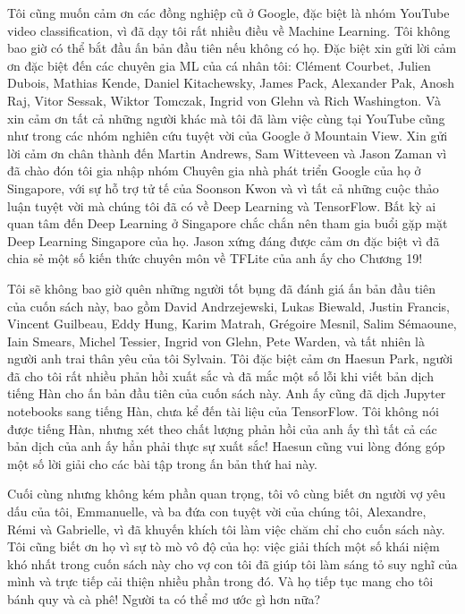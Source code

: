 Tôi cũng muốn cảm ơn các đồng nghiệp cũ ở Google, đặc biệt là nhóm YouTube video classification, vì đã dạy tôi rất nhiều điều về Machine Learning. Tôi không bao giờ có thể bắt đầu ấn bản đầu tiên nếu không có họ. Đặc biệt xin gửi lời cảm ơn đặc biệt đến các chuyên gia ML của cá nhân tôi: Clément Courbet, Julien Dubois, Mathias Kende, Daniel Kitachewsky, James Pack, Alexander Pak, Anosh Raj, Vitor Sessak, Wiktor Tomczak, Ingrid von Glehn và Rich Washington. Và xin cảm ơn tất cả những người khác mà tôi đã làm việc cùng tại YouTube cũng như trong các nhóm nghiên cứu tuyệt vời của Google ở ​​Mountain View. Xin gửi lời cảm ơn chân thành đến Martin Andrews, Sam Witteveen và Jason Zaman vì đã chào đón tôi gia nhập nhóm Chuyên gia nhà phát triển Google của họ ở Singapore, với sự hỗ trợ tử tế của Soonson Kwon và vì tất cả những cuộc thảo luận tuyệt vời mà chúng tôi đã có về Deep Learning và TensorFlow. Bất kỳ ai quan tâm đến Deep Learning ở Singapore chắc chắn nên tham gia buổi gặp mặt Deep Learning Singapore của họ. Jason xứng đáng được cảm ơn đặc biệt vì đã chia sẻ một số kiến ​​thức chuyên môn về TFLite của anh ấy cho Chương 19!

Tôi sẽ không bao giờ quên những người tốt bụng đã đánh giá ấn bản đầu tiên của cuốn sách này, bao gồm David Andrzejewski, Lukas Biewald, Justin Francis, Vincent Guilbeau, Eddy Hung, Karim Matrah, Grégoire Mesnil, Salim Sémaoune, Iain Smears, Michel Tessier, Ingrid von Glehn, Pete Warden, và tất nhiên là người anh trai thân yêu của tôi Sylvain. Tôi đặc biệt cảm ơn Haesun Park, người đã cho tôi rất nhiều phản hồi xuất sắc và đã mắc một số lỗi khi viết bản dịch tiếng Hàn cho ấn bản đầu tiên của cuốn sách này. Anh ấy cũng đã dịch Jupyter notebooks sang tiếng Hàn, chưa kể đến tài liệu của TensorFlow. Tôi không nói được tiếng Hàn, nhưng xét theo chất lượng phản hồi của anh ấy thì tất cả các bản dịch của anh ấy hẳn phải thực sự xuất sắc! Haesun cũng vui lòng đóng góp một số lời giải cho các bài tập trong ấn bản thứ hai này.

Cuối cùng nhưng không kém phần quan trọng, tôi vô cùng biết ơn người vợ yêu dấu của tôi, Emmanuelle, và ba đứa con tuyệt vời của chúng tôi, Alexandre, Rémi và Gabrielle, vì đã khuyến khích tôi làm việc chăm chỉ cho cuốn sách này. Tôi cũng biết ơn họ vì sự tò mò vô độ của họ: việc giải thích một số khái niệm khó nhất trong cuốn sách này cho vợ con tôi đã giúp tôi làm sáng tỏ suy nghĩ của mình và trực tiếp cải thiện nhiều phần trong đó. Và họ tiếp tục mang cho tôi bánh quy và cà phê! Người ta có thể mơ ước gì hơn nữa?


